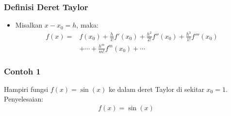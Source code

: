 \documentclass[pdflatex,compress]{beamer}
\begin{document}
\begin{frame}
	\frametitle{Definisi Deret Taylor}
	\begin{itemize}
		\item Misalkan $ x - x_0 = h $, maka:
		\begin{align*}
			f(x) =& f(x_0) + \frac{h}{1!}f'(x_0) + \frac{h^2}{2!}f''(x_0) + \frac{h^3}{1!}f'''(x_0) \\
			&+ \cdots + \frac{h^m}{m!}f^m(x_0) + \cdots
		\end{align*}
	\end{itemize}
\end{frame}

\begin{frame}
	\frametitle{Contoh 1}
	Hampiri fungsi $ f(x) = \sin(x) $ ke dalam deret Taylor di sekitar $ x_0 = 1 $. \\
	Penyelesaian: \\
	
	\begin{align*}
		f(x) = \sin(x)
	\end{align*}
	
	
\end{frame}
	
\end{document}

